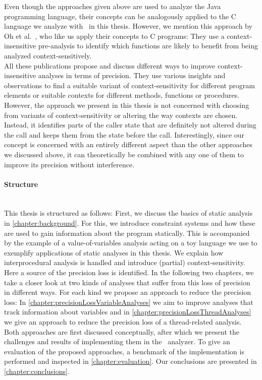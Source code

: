   Even though the approaches given above are used to analyze the Java programming language, their concepts can be analogously applied to the C language we analyze with \gob\ in this thesis. However, we mention this approach by Oh et al.~\parencite{oh2014selective}, who like us apply their concepts to C programs: They use a context-insensitive pre-analysis to identify which functions are likely to benefit from being analyzed context-sensitively.\\
  All these publications propose and discuss different ways to improve context-insensitive analyses in terms of precision. They use various insights and observations to find a suitable variant of context-sensitivity for different program elements or suitable contexts for different methods, functions or procedures. However, the approach we present in this thesis is not concerned with choosing from variants of context-sensitivity or altering the way contexts are chosen. Instead, it identifies parts of the caller state that are definitely not altered during the call and keeps them from the state before the call. Interestingly, since our concept is concerned with an entirely different aspect than the other approaches we discussed above, it can theoretically be combined with any one of them to improve its precision without interference.

  \paragraph{Structure}\mbox{}\\
  This thesis is structured as follows: First, we discuss the basics of static analysis in \autoref{chapter:background}. For this, we introduce constraint systems and how these are used to gain information about the program statically. This is accompanied by the example of a value-of-variables analysis acting on a toy language we use to exemplify applications of static analyses in this thesis. We explain how interprocedural analysis is handled and introduce (partial) context-sensitivity. Here a source of the precision loss is identified. In the following two chapters, we take a closer look at two kinds of analyses that suffer from this loss of precision in different ways. For each kind we propose an approach to reduce the precision loss: In \autoref{chapter:precisionLossVariableAnalyses} we aim to improve analyses that track information about variables and in \autoref{chapter:precisionLossThreadAnalyses} we give an approach to reduce the precision loss of a thread-related analysis. Both approaches are first discussed conceptually, after which we present the challenges and results of implementing them in the \gob\ analyzer. To give an evaluation of the proposed approaches, a benchmark of the implementation is performed and inspected in \autoref{chapter:evaluation}. Our conclusions are presented in \autoref{chapter:conclusions}.


